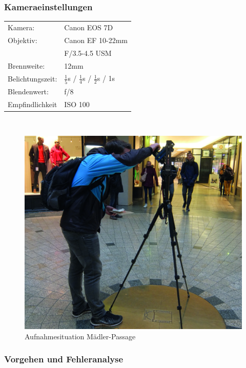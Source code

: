 \documentclass[liststotoc,bibtotoc,fontsize=14pt,]{scrreprt}
\begin{document}
			\subsubsection{Kameraeinstellungen}
			\begin{minipage}{0.58\textwidth}
				\begin{tabular}{ll}
					Kamera: &Canon EOS 7D \\
					Objektiv: &Canon EF 10-22mm \\
					& F/3.5-4.5 USM\\		
					Brennweite:& 12mm \\
					Belichtungszeit: &$\frac{1}{5}$s / $\frac{1}{4}$s / $\frac{1}{2}$s / 1s\\
					Blendenwert: & f/8\\
					Empfindlichkeit & ISO 100 \\
				\end{tabular}\\
			\end{minipage}%
			\begin{minipage}{0.42\textwidth}
				\begin{figure}[H]
					\includegraphics[width=\linewidth]{img/places/mae.jpg}
					\caption{Aufnahmesituation  Mädler-Passage}
					\label{img:ak}
				\end{figure}
			\end{minipage}%
			
			\subsubsection{Vorgehen und Fehleranalyse}
			
\end{document}
